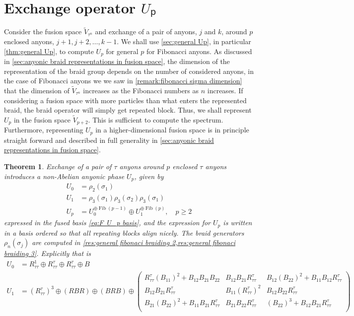 \documentclass[a4paper,10pt,oneside]{book}
\theoremstyle{plain}
\newtheorem{theorem}{Theorem}[section]
\theoremstyle{definition}
\theoremstyle{remark}
\DeclareMathOperator{\Fib}{Fib}
\begin{document}
\section{Exchange operator $Uₚ$}\label{sec:fibonacci Up}

Consider the fusion space $\widetilde{V}_{τ^n}$ and exchange of a pair of anyons, $j$ and $k$, around $p$ enclosed anyons, $j+1, j+2, \ldots, k-1$.
We shall use \cref{sec:general Up}, in particular \cref{thm:general Up}, to compute $U_p$ for general $p$ for Fibonacci anyons. As discussed in \cref{sec:anyonic braid representations in fusion space}, the dimension of the representation of the braid group depends on the number of considered anyons, in the case of Fibonacci anyons we we saw in \cref{remark:fibonacci sigma dimension} that the dimension of $\widetilde{V}_{τ^n}$ increases as the Fibonacci numbers as $n$ increases. If considering a fusion space with more particles than what enters the represented braid, the braid operator will simply get repeated block. Thus, we shall represent $U_p$ in the fusion space $\widetilde{V}_{p+2}$. This is sufficient to compute the spectrum. Furthermore, representing $U_p$ in a higher-dimensional fusion space is in principle straight forward and described in full generality in \cref{sec:anyonic braid representations in fusion space}.

\begin{theorem}\label{thm:fibonacci U_p}
  Exchange of a pair of $τ$ anyons around $p$ enclosed $τ$ anyons introduces a non-Abelian anyonic phase $U_p$, given by
  \begin{align*}
    U_0 &= ρ_2(σ_1) \\
    U_1 &= ρ_3(σ_1) ρ_3(σ_2) ρ_3(σ_1) \\
    U_p &= U_0^{\oplus\Fib(p-1)} \oplus U_1^{\oplus\Fib(p)}, \quad p \ge 2
  \end{align*}
  expressed in the fused basis \cref{eq:F U_p basis}, and the expression for $U_p$ is written in a basis ordered so that all repeating blocks align nicely. The braid generators $ρ_n(σ_j)$ are computed in \cref{res:general fibonaci braiding 2,res:general fibonaci braiding 3}.
  Explicitly that is
  \begin{align*}
    U_0 &= R_{ττ}^1 \oplus R_{ττ}^τ \oplus R_{ττ}^τ \oplus B \\
    U_1 &= \left( R_{ττ}^τ \right)^3 \oplus \left( RBR \right) \oplus \left( BRB \right) \oplus
    \begin{pmatrix}
      R_{\tau\tau}^\tau \left(B_{11}\right)^2+B_{12} B_{21} B_{22} & B_{12} B_{21} R_{\tau\tau}^\tau & B_{12} \left(B_{22}\right)^2+B_{11} B_{12} R_{\tau\tau}^\tau \\
      B_{12} B_{21} R_{\tau\tau}^\tau & B_{11} \left(R_{\tau\tau}^\tau\right)^2 & B_{12} B_{22} R_{\tau\tau}^\tau \\
      B_{21} \left(B_{22}\right)^2+B_{11} B_{21} R_{\tau\tau}^\tau & B_{21} B_{22} R_{\tau\tau}^\tau & \left(B_{22}\right)^3+B_{12} B_{21} R_{\tau\tau}^\tau \\
    \end{pmatrix}
  \end{align*}
\end{theorem}
\end{document}
